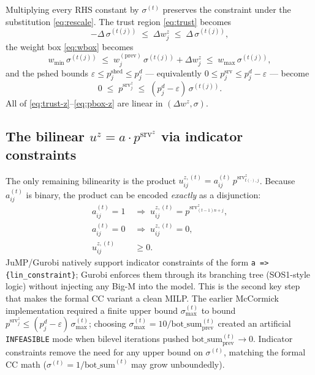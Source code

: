 \documentclass[11pt]{article}
\newcommand{\pshed}{p^{\mathrm{shed}}}
\newcommand{\pserved}{p^{\mathrm{srv}}}
\newcommand{\wprev}{w^{(\mathrm{prev})}}
\begin{document}
Multiplying every RHS constant by $\sigma^{(t)}$ preserves the constraint under
the substitution \eqref{eq:rescale}. The trust region \eqref{eq:trust} becomes
\begin{equation}\label{eq:trust-z}
    -\Delta\,\sigma^{(t(j))} \;\le\; \Delta w^{z}_{j} \;\le\; \Delta\,\sigma^{(t(j))},
\end{equation}
the weight box \eqref{eq:wbox} becomes
\begin{equation}\label{eq:wbox-z}
    w_{\min}\,\sigma^{(t(j))} \;\le\; \wprev_{j}\,\sigma^{(t(j))} + \Delta w^{z}_{j} \;\le\; w_{\max}\,\sigma^{(t(j))},
\end{equation}
and the pshed bounds $\varepsilon \le \pshed_{j} \le p^{d}_{j}$ — equivalently
$0 \le \pserved_{j} \le p^{d}_{j} - \varepsilon$ — become
\begin{equation}\label{eq:pbox-z}
    0 \;\le\; \pserved^{z}_{j} \;\le\; (p^{d}_{j} - \varepsilon)\,\sigma^{(t(j))}.
\end{equation}
All of \eqref{eq:trust-z}--\eqref{eq:pbox-z} are linear in
$(\Delta w^{z}, \sigma)$.

\subsection{The bilinear $u^{z} = a \cdot \pserved^{z}$ via indicator constraints}

The only remaining bilinearity is the product $u^{z,(t)}_{ij} = a^{(t)}_{ij}\,\pserved^{z}_{t(\cdot),j}$.
Because $a^{(t)}_{ij}$ is binary, the product can be encoded \emph{exactly} as
a disjunction:
\begin{align}
    a^{(t)}_{ij} = 1 \;&\Longrightarrow\; u^{z,(t)}_{ij} = \pserved^{z}_{(t-1)n+j}, \label{eq:ind1}\\
    a^{(t)}_{ij} = 0 \;&\Longrightarrow\; u^{z,(t)}_{ij} = 0, \label{eq:ind2}\\
    u^{z,(t)}_{ij} &\ge 0.\nonumber
\end{align}
JuMP/Gurobi natively support indicator constraints of the form
\texttt{a => \{lin\_constraint\}}; Gurobi enforces them through its branching
tree (SOS1-style logic) without injecting any Big-M into the model. This is
the second key step that makes the formal CC variant a clean MILP. The earlier
McCormick implementation required a finite upper bound $\sigma_{\max}^{(t)}$ to
bound $\pserved^{z}_{j} \le (p^{d}_{j} - \varepsilon)\,\sigma_{\max}^{(t)}$;
choosing $\sigma_{\max}^{(t)} = 10 / \mathrm{bot\_sum}_{\mathrm{prev}}^{(t)}$
created an artificial \texttt{INFEASIBLE} mode when bilevel iterations pushed
$\mathrm{bot\_sum}_{\mathrm{prev}}^{(t)} \to 0$. Indicator constraints remove
the need for any upper bound on $\sigma^{(t)}$, matching the formal CC math
($\sigma^{(t)} = 1/\mathrm{bot\_sum}^{(t)}$ may grow unboundedly).
\end{document}

